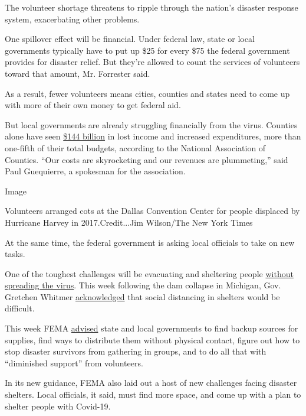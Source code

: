 The volunteer shortage threatens to ripple through the nation's disaster
response system, exacerbating other problems.

One spillover effect will be financial. Under federal law, state or
local governments typically have to put up \$25 for every \$75 the
federal government provides for disaster relief. But they're allowed to
count the services of volunteers toward that amount, Mr. Forrester said.

As a result, fewer volunteers means cities, counties and states need to
come up with more of their own money to get federal aid.

But local governments are already struggling financially from the virus.
Counties alone have seen
\href{https://www.naco.org/sites/default/files/documents/NACo_COVID-19_Fiscal_Impact_Analysis-Executive_Summary_0.pdf}{\$144
billion} in lost income and increased expenditures, more than one-fifth
of their total budgets, according to the National Association of
Counties. ``Our costs are skyrocketing and our revenues are
plummeting,'' said Paul Guequierre, a spokesman for the association.

Image

Volunteers arranged cots at the Dallas Convention Center for people
displaced by Hurricane Harvey in 2017.Credit...Jim Wilson/The New York
Times

At the same time, the federal government is asking local officials to
take on new tasks.

One of the toughest challenges will be evacuating and sheltering people
\href{https://www.nytimes3xbfgragh.onion/2020/03/21/climate/virus-fema-disaster-aid-shelter.html}{without
spreading the virus}. This week following the dam collapse in Michigan,
Gov. Gretchen Whitmer
\href{https://www.nytimes3xbfgragh.onion/2020/05/19/us/michigan-dam-breach.html?action=click\&module=Top\%20Stories\&pgtype=Homepage}{acknowledged}
that social distancing in shelters would be difficult.

This week FEMA
\href{https://www.fema.gov/media-library-data/1589997234798-adb5ce5cb98a7a89e3e1800becf0eb65/2020_Hurricane_Pandemic_Plan.pdf}{advised}
state and local governments to find backup sources for supplies, find
ways to distribute them without physical contact, figure out how to stop
disaster survivors from gathering in groups, and to do all that with
``diminished support'' from volunteers.

In its new guidance, FEMA also laid out a host of new challenges facing
disaster shelters. Local officials, it said, must find more space, and
come up with a plan to shelter people with Covid-19.

